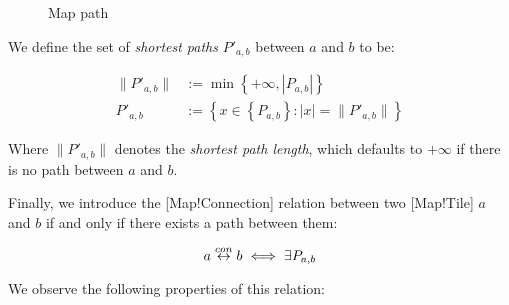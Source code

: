 \begin{figure}[htbp]
    \centering
    \caption{Map path}\label{fig:map_path}
\end{figure}

We define the set of \emph{shortest paths} \(P'_{a,b}\) between \(a\) and \(b\) to be:

\begin{align}\label{eq:map_path_short}
    \|P'_{a,b}\| &:= \min\left \{ +\infty, |P_{a,b}| \right \}\nonumber \\
    P'_{a,b} &:= \left \{ x \in \left \{ P_{a,b} \right \} :
        |x| = \|P'_{a,b}\|
    \right \}
\end{align}

Where \( \|P'_{a,b}\| \) denotes the \emph{shortest path length}, which defaults to \(+\infty \) if there is no path between \(a\) and \(b\).

Finally, we introduce the [Map!Connection] relation between two [Map!Tile] \(a\) and \(b\) if and only if there exists a path between them:

\begin{equation}
    a \overset{con}{\leftrightarrow} b \iff \exists P_{a,b}\\
\end{equation}

We observe the following properties of this relation:

